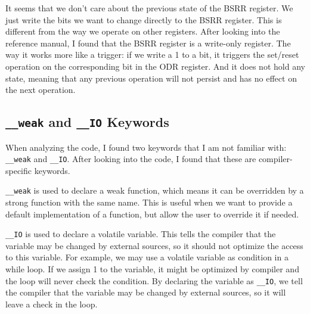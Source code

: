 \documentclass[a4paper,12pt]{article}
\begin{document}
It seems that we don't care about the previous state of the BSRR register. We just write the bits we want to change directly to the BSRR register. This is different from the way we operate on other registers. 
After looking into the reference manual, I found that the BSRR register is a write-only register. The way it works more like a trigger: if we write a 1 to a bit, it triggers the set/reset operation on the corresponding bit in the ODR register. And it does not hold any state, meaning that any previous operation will not persist and has no effect on the next operation.

\subsection{\texttt{\_\_weak} and \texttt{\_\_IO} Keywords}

When analyzing the code, I found two keywords that I am not familiar with: \texttt{\_\_weak} and \texttt{\_\_IO}. After looking into the code, I found that these are compiler-specific keywords.

\texttt{\_\_weak} is used to declare a weak function, which means it can be overridden by a strong function with the same name. This is useful when we want to provide a default implementation of a function, but allow the user to override it if needed.

\texttt{\_\_IO} is used to declare a volatile variable. This tells the compiler that the variable may be changed by external sources, so it should not optimize the access to this variable. For example, we may use a volatile variable as condition in a while loop. If we assign 1 to the variable, it might be optimized by compiler and the loop will never check the condition. By declaring the variable as \texttt{\_\_IO}, we tell the compiler that the variable may be changed by external sources, so it will leave a check in the loop.
\end{document}
